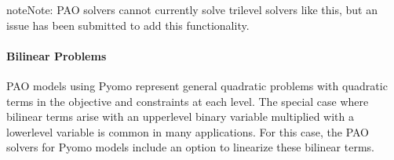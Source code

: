 \documentclass[letterpaper,10pt,english]{sphinxmanual}
\begin{document}
\begin{sphinxVerbatim}[commandchars=\\\{\}]
           
           
           
          
\end{sphinxVerbatim}

\begin{sphinxadmonition}{note}{Note:}
PAO solvers cannot currently solve trilevel solvers like this,
but an issue has been submitted to add this functionality.
\end{sphinxadmonition}


\paragraph{Bilinear Problems}
\label{\detokenize{representations/pyomo:bilinear-problems}}
PAO models using Pyomo represent general quadratic problems with quadratic
terms in the objective and constraints at each level.  The special
case where bilinear terms arise with an upper\sphinxhyphen{}level binary variable
multiplied with a lower\sphinxhyphen{}level variable is common in many applications.
For this case, the PAO solvers for Pyomo models include an option to
linearize these bilinear terms.
\end{document}
